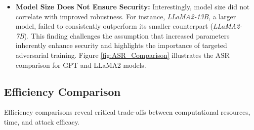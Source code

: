 \documentclass[18pt]{article}
\begin{document}
\begin{itemize}
    \item \textbf{Model Size Does Not Ensure Security:} 
    Interestingly, model size did not correlate with improved robustness. For instance, \textit{LLaMA2-13B}, a larger model, failed to consistently outperform its smaller counterpart (\textit{LLaMA2-7B}). This finding challenges the assumption that increased parameters inherently enhance security and highlights the importance of targeted adversarial training. Figure \ref{fig:ASR_Comparison} illustrates the ASR comparison for GPT and LLaMA2 models.
\end{itemize}

\subsection{Efficiency Comparison}
Efficiency comparisons reveal critical trade-offs between computational resources, time, and attack efficacy.
\end{document}
